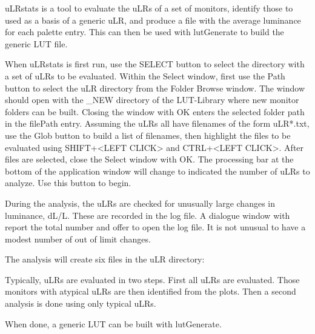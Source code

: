uLRstats is a tool to evaluate the uLRs of a set of monitors, identify those to used as a basis of a generic uLR, and produce a file with the average luminance for each palette entry. This can then be used with lutGenerate to build the generic LUT file. 

When uLRstats is first run, use the SELECT button to select the directory with a set of uLRs to be evaluated. Within the Select window, first use the Path button to select the uLR directory from the Folder Browse window. The window should open with the \_NEW directory of the LUT-Library where new monitor folders can be built. Closing the window with OK enters the selected folder path in the filePath entry. Assuming the uLRs all have filenames of the form uLR*.txt, use the Glob button to build a list of filenames, then highlight the files to be evaluated using SHIFT+<LEFT CLICK> and CTRL+<LEFT CLICK>. After files are selected, close the Select window with OK. The processing bar at the bottom of the application window will change to indicated the number of uLRs to analyze. Use this button to begin. 

During the analysis, the uLRs are checked for unusually large changes in luminance, dL/L. These are recorded in the log file. A dialogue window with report the total number and offer to open the log file. It is not unusual to have a modest number of out of limit changes. 

The analysis will create six files in the uLR directory:


Typically, uLRs are evaluated in two steps. First all uLRs are evaluated. Those monitors with atypical uLRs are then identified from the plots. Then a second analysis is done using only typical uLRs. 

When done, a generic LUT can be built with lutGenerate.

%